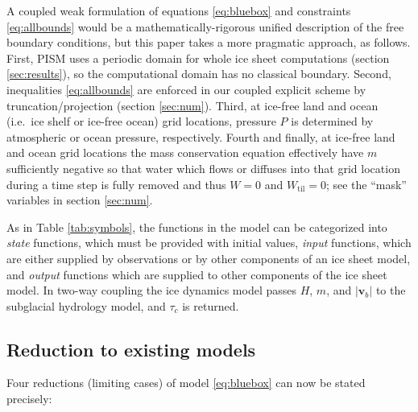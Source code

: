 \documentclass[gmd]{copernicus}   %
\newcommand{\text}{\textrm}
\newcommand\bv{\mathbf{v}}
\newcommand{\Wtil}{W_{\text{til}}}
\begin{document}
A coupled weak formulation of equations \eqref{eq:bluebox} and constraints \eqref{eq:allbounds} would be a mathematically-rigorous unified description of the free boundary conditions, but this paper takes a more pragmatic approach, as follows.  First, PISM uses a periodic domain for whole ice sheet computations (section \ref{sec:results}), so the computational domain has no classical boundary.  Second, inequalities \eqref{eq:allbounds} are enforced in our coupled explicit scheme by truncation/projection (section \ref{sec:num}).  Third, at ice-free land and ocean (i.e.~ice shelf or ice-free ocean) grid locations, pressure $P$ is determined by atmospheric or ocean pressure, respectively.  Fourth and finally, at ice-free land and ocean grid locations the mass conservation equation effectively have $m$ sufficiently negative so that water which flows or diffuses into that grid location during a time step is fully removed and thus $W=0$ and $\Wtil=0$; see the ``mask'' variables in section \ref{sec:num}.

As in Table \ref{tab:symbols}, the functions in the model can be categorized into \emph{state} functions, which must be provided with initial values, \emph{input} functions, which are either supplied by observations or by other components of an ice sheet model, and \emph{output} functions which are supplied to other components of the ice sheet model.  In two-way coupling the ice dynamics model passes $H$, $m$, and $|\bv_b|$ to the subglacial hydrology model, and $\tau_c$ is returned.

\subsection{Reduction to existing models}  Four reductions (limiting cases) of model \eqref{eq:bluebox} can now be stated precisely:
\end{document}
